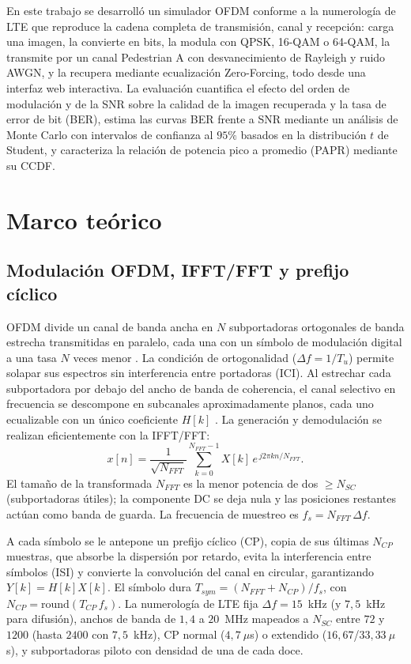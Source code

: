 \documentclass[conference,onecolumn]{IEEEtran}
\begin{document}
En este trabajo se desarroll\'o un simulador OFDM conforme a la numerolog\'ia de LTE que reproduce la cadena completa de transmisi\'on, canal y recepci\'on: carga una imagen, la convierte en bits, la modula con QPSK, 16-QAM o 64-QAM, la transmite por un canal Pedestrian A con desvanecimiento de Rayleigh y ruido AWGN, y la recupera mediante ecualizaci\'on Zero-Forcing, todo desde una interfaz web interactiva. La evaluaci\'on cuantifica el efecto del orden de modulaci\'on y de la SNR sobre la calidad de la imagen recuperada y la tasa de error de bit (BER), estima las curvas BER frente a SNR mediante un an\'alisis de Monte Carlo con intervalos de confianza al $95\%$ basados en la distribuci\'on $t$ de Student, y caracteriza la relaci\'on de potencia pico a promedio (PAPR) mediante su CCDF.

\section{Marco te\'orico}

\subsection{Modulaci\'on OFDM, IFFT/FFT y prefijo c\'iclico}

OFDM divide un canal de banda ancha en $N$ subportadoras ortogonales de banda estrecha transmitidas en paralelo, cada una con un s\'imbolo de modulaci\'on digital a una tasa $N$ veces menor \cite{3gpp36211,cho2010mimo}. La condici\'on de ortogonalidad ($\Delta f = 1/T_u$) permite solapar sus espectros sin interferencia entre portadoras (ICI). Al estrechar cada subportadora por debajo del ancho de banda de coherencia, el canal selectivo en frecuencia se descompone en subcanales aproximadamente planos, cada uno ecualizable con un \'unico coeficiente $H[k]$ \cite{goldsmith2005wireless}. La generaci\'on y demodulaci\'on se realizan eficientemente con la IFFT/FFT:
\begin{equation}
x[n] = \frac{1}{\sqrt{N_{FFT}}}\sum_{k=0}^{N_{FFT}-1} X[k]\, e^{\,j 2\pi k n / N_{FFT}}.
\end{equation}
El tama\~no de la transformada $N_{FFT}$ es la menor potencia de dos $\ge N_{SC}$ (subportadoras \'utiles); la componente DC se deja nula y las posiciones restantes act\'uan como banda de guarda. La frecuencia de muestreo es $f_s = N_{FFT}\,\Delta f$.

A cada s\'imbolo se le antepone un prefijo c\'iclico (CP), copia de sus \'ultimas $N_{CP}$ muestras, que absorbe la dispersi\'on por retardo, evita la interferencia entre s\'imbolos (ISI) y convierte la convoluci\'on del canal en circular, garantizando $Y[k]=H[k]X[k]$. El s\'imbolo dura $T_{sym}=(N_{FFT}+N_{CP})/f_s$, con $N_{CP}=\mathrm{round}(T_{CP}\,f_s)$. La numerolog\'ia de LTE \cite{3gpp36211} fija $\Delta f = 15$~kHz (y $7{,}5$~kHz para difusi\'on), anchos de banda de $1{,}4$ a $20$~MHz mapeados a $N_{SC}$ entre $72$ y $1200$ (hasta $2400$ con $7{,}5$~kHz), CP normal ($4{,}7~\mu$s) o extendido ($16{,}67$/$33{,}33~\mu$s), y subportadoras piloto con densidad de una de cada doce.
\end{document}
